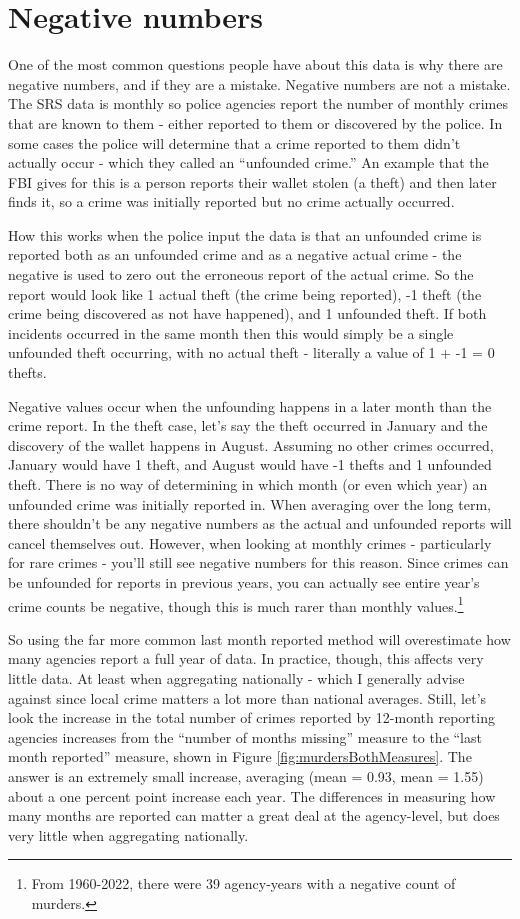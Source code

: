 \documentclass[
]{krantz}
\begin{document}
\section{Negative numbers}\label{negative-numbers}

One of the most common questions people have about this data
is why there are negative numbers, and if they are a
mistake. Negative numbers are not a mistake. The SRS data is
monthly so police agencies report the number of monthly
crimes that are known to them - either reported to them or
discovered by the police. In some cases the police will
determine that a crime reported to them didn't actually
occur - which they called an ``unfounded crime.'' An example
that the FBI gives for this is a person reports their wallet
stolen (a theft) and then later finds it, so a crime was
initially reported but no crime actually occurred.

How this works when the police input the data is that an
unfounded crime is reported both as an unfounded crime and
as a negative actual crime - the negative is used to zero
out the erroneous report of the actual crime. So the report
would look like 1 actual theft (the crime being reported),
-1 theft (the crime being discovered as not have happened),
and 1 unfounded theft. If both incidents occurred in the
same month then this would simply be a single unfounded
theft occurring, with no actual theft - literally a value of
1 + -1 = 0 thefts.

Negative values occur when the unfounding happens in a later
month than the crime report. In the theft case, let's say
the theft occurred in January and the discovery of the
wallet happens in August. Assuming no other crimes occurred,
January would have 1 theft, and August would have -1 thefts
and 1 unfounded theft. There is no way of determining in
which month (or even which year) an unfounded crime was
initially reported in. When averaging over the long term,
there shouldn't be any negative numbers as the actual and
unfounded reports will cancel themselves out. However, when
looking at monthly crimes - particularly for rare crimes -
you'll still see negative numbers for this reason. Since
crimes can be unfounded for reports in previous years, you
can actually see entire year's crime counts be negative,
though this is much rarer than monthly values.\footnote{From
  1960-2022, there were 39 agency-years with a negative
  count of murders.}

So using the far more common last month reported method will
overestimate how many agencies report a full year of data.
In practice, though, this affects very little data. At least
when aggregating nationally - which I generally advise
against since local crime matters a lot more than national
averages. Still, let's look the increase in the total number
of crimes reported by 12-month reporting agencies increases
from the ``number of months missing'' measure to the ``last
month reported'' measure, shown in Figure
\ref{fig:murdersBothMeasures}. The answer is an extremely
small increase, averaging (mean = 0.93, mean = 1.55) about a
one percent point increase each year. The differences in
measuring how many months are reported can matter a great
deal at the agency-level, but does very little when
aggregating nationally.
\end{document}
